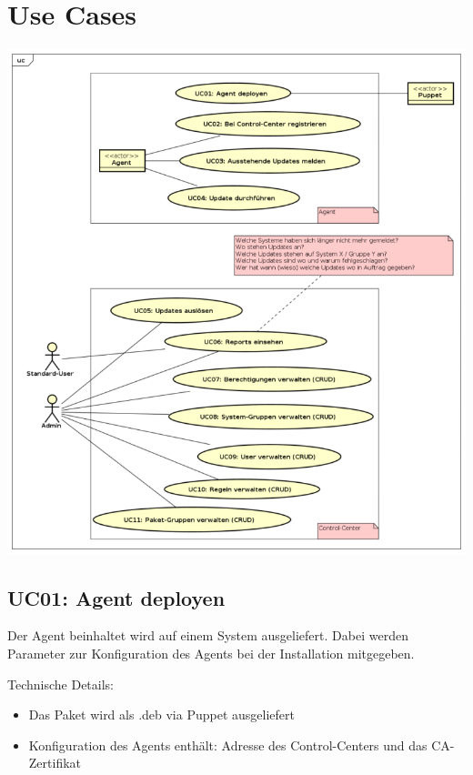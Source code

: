 \section{Use Cases}

\includegraphics[width=\textwidth]{files/UseCases_small}
\xxx[caption]

\xxx[finish]

\subsection*{UC01: Agent deployen}
\label{sec:uc_01}

Der Agent beinhaltet wird auf einem System ausgeliefert. Dabei werden Parameter zur Konfiguration des Agents bei der Installation mitgegeben.


Technische Details:

\begin{itemize}
    \item Das Paket wird als .deb via Puppet ausgeliefert
    \item Konfiguration des Agents enthält: Adresse des Control-Centers und das CA-Zertifikat
\end{itemize}


